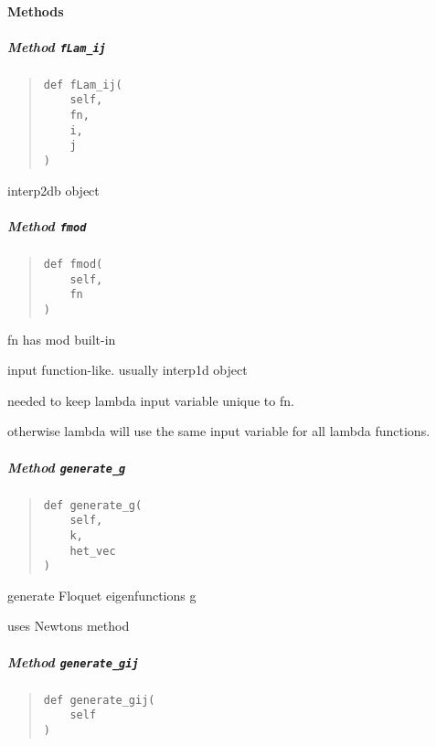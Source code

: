 \documentclass[english,a4paper,oneside]{article}
\let\oldparagraph\paragraph
\renewcommand{\paragraph}[1]{\oldparagraph{#1}\mbox{}}
\let\oldsubparagraph\subparagraph
\renewcommand{\subparagraph}[1]{\oldsubparagraph{#1}\mbox{}}
\begin{document}
\hypertarget{methods}{%
\paragraph{Methods}\label{methods}}

\hypertarget{nBodyCoupling.nBodyCoupling.fLam_ij}{%
\subparagraph{\texorpdfstring{Method
\texttt{fLam\_ij}}{Method fLam\_ij}}\label{nBodyCoupling.nBodyCoupling.fLam_ij}}

\begin{quote}
\begin{verbatim}
def fLam_ij(
    self,
    fn,
    i,
    j
)
\end{verbatim}
\end{quote}

interp2db object

\hypertarget{nBodyCoupling.nBodyCoupling.fmod}{%
\subparagraph{\texorpdfstring{Method
\texttt{fmod}}{Method fmod}}\label{nBodyCoupling.nBodyCoupling.fmod}}

\begin{quote}
\begin{verbatim}
def fmod(
    self,
    fn
)
\end{verbatim}
\end{quote}

fn has mod built-in

input function-like. usually interp1d object

needed to keep lambda input variable unique to fn.

otherwise lambda will use the same input variable for all lambda
functions.

\hypertarget{nBodyCoupling.nBodyCoupling.generate_g}{%
\subparagraph{\texorpdfstring{Method
\texttt{generate\_g}}{Method generate\_g}}\label{nBodyCoupling.nBodyCoupling.generate_g}}

\begin{quote}
\begin{verbatim}
def generate_g(
    self,
    k,
    het_vec
)
\end{verbatim}
\end{quote}

generate Floquet eigenfunctions g

uses Newtons method

\hypertarget{nBodyCoupling.nBodyCoupling.generate_gij}{%
\subparagraph{\texorpdfstring{Method
\texttt{generate\_gij}}{Method generate\_gij}}\label{nBodyCoupling.nBodyCoupling.generate_gij}}

\begin{quote}
\begin{verbatim}
def generate_gij(
    self
)
\end{verbatim}
\end{quote}
\end{document}
